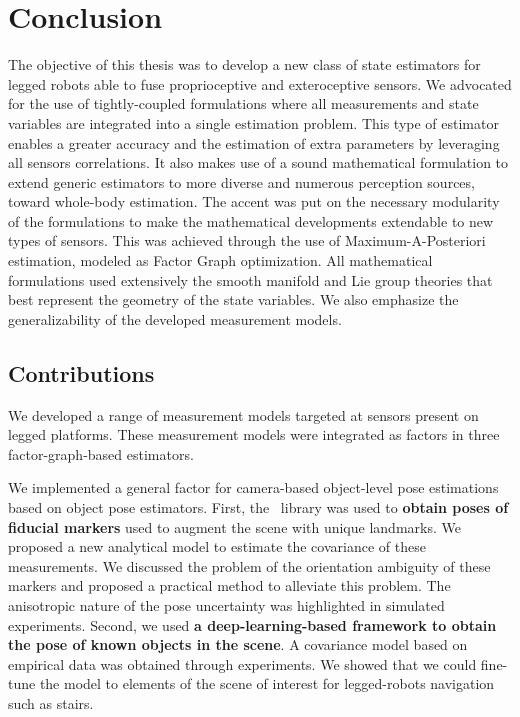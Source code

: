 \chapter{Conclusion}

The objective of this thesis was to develop a new class of state estimators for legged robots able to fuse proprioceptive and exteroceptive
sensors. We advocated for the use of tightly-coupled formulations where all measurements and state variables are integrated into a single estimation 
problem. This type of estimator enables a greater accuracy and the estimation of extra parameters by leveraging all sensors correlations.
It also makes use of a sound mathematical formulation to extend generic estimators to more diverse and numerous perception sources, toward whole-body estimation.
The accent was put on the necessary modularity of the formulations to make the mathematical developments extendable to new types of sensors. This 
was achieved through the use of Maximum-A-Posteriori estimation, modeled as Factor Graph optimization. All mathematical formulations used extensively the smooth manifold
and Lie group theories that best represent the geometry of the state variables. We also emphasize the generalizability of the developed measurement models. 

\section{Contributions}

We developed a range of measurement models targeted at sensors present on legged platforms. These measurement models were integrated as factors in 
three factor-graph-based estimators.

We implemented a general factor for camera-based object-level pose estimations based on object pose estimators. 
First, the \apriltag\ library was used 
to \textbf{obtain poses of fiducial markers} used to augment the scene with unique landmarks. We proposed a new analytical model to estimate the covariance of 
these measurements. We discussed the problem of the orientation ambiguity of these markers and proposed a practical method to alleviate this problem.
The anisotropic nature of the pose uncertainty was highlighted in simulated experiments. 
Second, we used \textbf{a deep-learning-based framework to obtain the pose of known objects in the scene}. A covariance model based on empirical data was obtained through
experiments. We showed that we could fine-tune the model to elements of the scene of interest for legged-robots navigation such as stairs.

